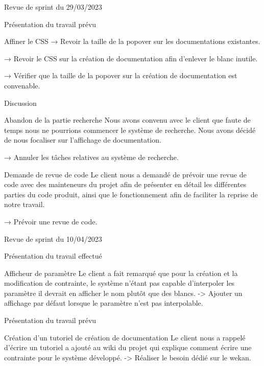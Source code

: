 \documentclass[]{article}
\begin{document}
{\begin{section}{Revue de sprint du 29/03/2023}
\begin{subsection}{Présentation du travail prévu}
\begin{subsubsection}{Affiner le CSS}
         → Revoir la taille de la popover sur les documentations existantes.

         → Revoir le CSS sur la création de documentation afin d’enlever le blanc inutile.

         → Vérifier que la taille de la popover sur la création de documentation est convenable.
     \end{subsubsection}
 \end{subsection}

 \begin{subsection}{Discussion}
     \begin{subsubsection}{Abandon de la partie recherche}
         Nous avons convenu avec le client que faute de temps nous ne pourrions commencer le système de recherche. Nous avons décidé de nous focaliser sur l’affichage de documentation.

         → Annuler les tâches relatives au système de recherche.
     \end{subsubsection}

     \begin{subsubsection}{Demande de revue de code}
         Le client nous a demandé de prévoir une revue de code avec des mainteneurs du projet afin de présenter en détail les différentes parties du code produit, ainsi que le fonctionnement afin de faciliter la reprise de notre travail.

         → Prévoir une revue de code.
     \end{subsubsection}
 \end{subsection}
\end{section}

\begin{section}{Revue de sprint du 10/04/2023}
    \begin{subsection}{Présentation du travail effectué}
        \begin{subsubsection}{Afficheur de paramètre}
            Le client a fait remarqué que pour la création et la modification de contrainte, le système n'étant pas capable d'interpoler les paramètre il devrait en afficher le nom plutôt que des blancs.
            -> Ajouter un affichage par défaut lorsque le paramètre n'est pas interpolable.
        \end{subsubsection}
    \end{subsection}
   
    \begin{subsection}{Présentation du travail prévu}
        \begin{subsubsection}{Création d'un tutoriel de création de documentation}
            Le client nous a rappelé d'écrire un tutoriel a ajouté au wiki du projet qui explique comment écrire une contrainte pour le système développé.
            -> Réaliser le besoin dédié sur le wekan.
        \end{subsubsection}
    \end{subsection}
   \end{section}
}
\end{document}
